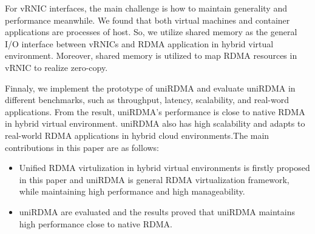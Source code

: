 For vRNIC interfaces, the main challenge is how to maintain generality and performance meanwhile. We found that both virtual machines and container applications are processes of host. So, we utilize shared memory as the general I/O interface between vRNICs and RDMA application in hybrid virtual environment. Moreover, shared memory is utilized to map RDMA resources in vRNIC to realize zero-copy. 

Finnaly, we implement the prototype of uniRDMA and evaluate uniRDMA in different benchmarks, such as throughput, latency, scalability, and real-word applications. From the result, uniRDMA's performance is close to native RDMA in hybrid virtual environment. uniRDMA also has high scalability and adapts to real-world RDMA applications in hybrid cloud environments.The main contributions in this paper are as follows:

\begin{itemize}
\item Unified RDMA virtulization in hybrid virtual environments is firstly proposed in this paper and uniRDMA is general RDMA virtualization framework,  while maintaining high performance and high manageability.

\item uniRDMA are evaluated and the results proved that uniRDMA maintains high performance close to native RDMA.
\end{itemize}
